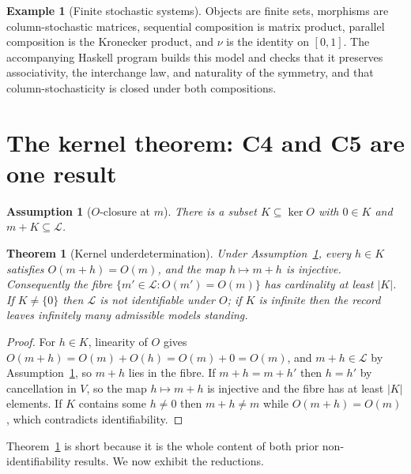 \documentclass[11pt]{article}
\newtheorem{assumption}[definition]{Assumption}
\newtheorem{theorem}[definition]{Theorem}
\theoremstyle{definition}
\newtheorem{example}[definition]{Example}
\begin{document}
\begin{example}[Finite stochastic systems]
\label{ex:stoch}
Objects are finite sets, morphisms are column-stochastic matrices, sequential
composition is matrix product, parallel composition is the Kronecker product,
and $\nu$ is the identity on $[0,1]$. The accompanying Haskell program builds
this model and checks that it preserves associativity, the interchange law, and
naturality of the symmetry, and that column-stochasticity is closed under both
compositions.
\end{example}

\section{The kernel theorem: C4 and C5 are one result}
\label{sec:kernel}

\begin{assumption}[$O$-closure at $m$]
\label{ass:closure}
There is a subset $K\subseteq\ker O$ with $0\in K$ and $m+K\subseteq\mathcal L$.
\end{assumption}

\begin{theorem}[Kernel underdetermination]
\label{thm:kernel}
Under Assumption~\ref{ass:closure}, every $h\in K$ satisfies $O(m+h)=O(m)$, and
the map $h\mapsto m+h$ is injective. Consequently the fibre
$\{m'\in\mathcal L: O(m')=O(m)\}$ has cardinality at least $|K|$. If
$K\neq\{0\}$ then $\mathcal L$ is not identifiable under $O$; if $K$ is infinite
then the record leaves infinitely many admissible models standing.
\end{theorem}
\begin{proof}
For $h\in K$, linearity of $O$ gives $O(m+h)=O(m)+O(h)=O(m)+0=O(m)$, and
$m+h\in\mathcal L$ by Assumption~\ref{ass:closure}, so $m+h$ lies in the fibre.
If $m+h=m+h'$ then $h=h'$ by cancellation in $V$, so the map $h\mapsto m+h$ is
injective and the fibre has at least $|K|$ elements. If $K$ contains some
$h\neq0$ then $m+h\neq m$ while $O(m+h)=O(m)$, which contradicts
identifiability.
\end{proof}

Theorem~\ref{thm:kernel} is short because it is the whole content of both prior
non-identifiability results. We now exhibit the reductions.
\end{document}
